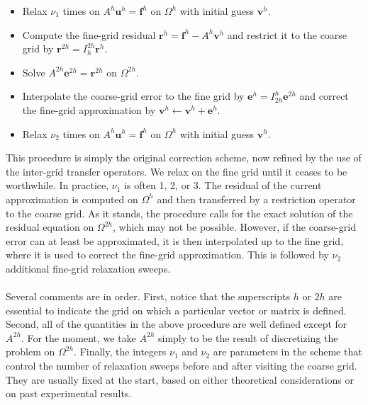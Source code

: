 \documentclass[11pt]{book}
\begin{document}
\begin{itemize}
  \item Relax $\nu_{1}$ times on $A^{h} \mathbf{u}^{h}=\mathbf{f}^{h}$ on $\Omega^{h}$ with initial guess $\mathbf{v}^{h}$.

  \item Compute the fine-grid residual $\mathbf{r}^{h}=\mathbf{f}^{h}-A^{h} \mathbf{v}^{h}$ and restrict it to the coarse grid by $\mathbf{r}^{2 h}=I_{h}^{2 h} \mathbf{r}^{h}$.

  \item Solve $A^{2 h} \mathbf{e}^{2 h}=\mathbf{r}^{2 h}$ on $\Omega^{2 h}$.

  \item Interpolate the coarse-grid error to the fine grid by $\mathbf{e}^{h}=I_{2 h}^{h} \mathbf{e}^{2 h}$ and correct the fine-grid approximation by $\mathbf{v}^{h} \leftarrow \mathbf{v}^{h}+\mathbf{e}^{h}$.

  \item Relax $\nu_{2}$ times on $A^{h} \mathbf{u}^{h}=\mathbf{f}^{h}$ on $\Omega^{h}$ with initial guess $\mathbf{v}^{h}$.

\end{itemize}
This procedure is simply the original correction scheme, now refined by the use of the inter-grid transfer operators. We relax on the fine grid until it ceases to be worthwhile. In practice, $\nu_{1}$ is often 1, 2, or 3. The residual of the current approximation is computed on $\Omega^{h}$ and then transferred by a restriction operator to the coarse grid. As it stands, the procedure calls for the exact solution of the residual equation on $\Omega^{2 h}$, which may not be possible. However, if the coarse-grid error can at least be approximated, it is then interpolated up to the fine grid, where it is used to correct the fine-grid approximation. This is followed by $\nu_{2}$ additional fine-grid relaxation sweeps. \\ \\
Several comments are in order. First, notice that the superscripts $h$ or $2 h$ are essential to indicate the grid on which a particular vector or matrix is defined. Second, all of the quantities in the above procedure are well defined except for $A^{2 h}$. For the moment, we take $A^{2 h}$ simply to be the result of discretizing the problem on $\Omega^{2 h}$. Finally, the integers $\nu_{1}$ and $\nu_{2}$ are parameters in the scheme that control the number of relaxation sweeps before and after visiting the coarse grid. They are usually fixed at the start, based on either theoretical considerations or on past experimental results.\\ \\
\end{document}
